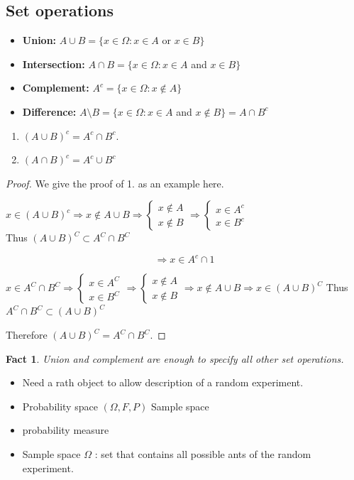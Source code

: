 \subsection{Set operations}
\begin{itemize}
  \item \textbf{Union:} \(A \cup B=\{x \in \Omega: x \in A\) or \(x \in B\}\)
  \item \textbf{Intersection:} \(A \cap B=\{x \in \Omega: x \in A\) and \(x \in B\}\)
  \item \textbf{Complement:} \(A^{c}=\{x \in \Omega: x \notin A\}\)
  \item \textbf{Difference:} \(A \setminus B=\{x \in \Omega: x \in A\) and \(x \notin B\}=A \cap B^{c}\)
\end{itemize}

\newtheorem{fact}{Fact}

\begin{theorem}
\begin{enumerate}
\item \((A \cup B)^{c}=A^{c} \cap B^{c}\).
\item \((A \cap B)^{c}=A^{c} \cup B^{c}\)
\end{enumerate}
\end{theorem}
\begin{proof}
We give the proof of 1. as an example here.

\(x \in(A \cup B)^{c} \Rightarrow x \notin A \cup B \Rightarrow\left\{\begin{array}{l}x \notin A \\ x \notin B\end{array} \Rightarrow\left\{\begin{array}{l}x \in A^{c} \\ x \in B^{c}\end{array}\right.\right.\)\\
Thus \((A \cup B)^{C} \subset A^{C} \cap B^{C}\)

\[
\Rightarrow x \in A^{c} \cap 1
\]

\(x \in A^{C} \cap B^{C} \Rightarrow\left\{\begin{array}{l}x \in A^{C} \\ x \in B^{C}\end{array} \Rightarrow\left\{\begin{array}{l}x \notin A \\ x \notin B\end{array} \Rightarrow x \notin A \cup B \Rightarrow x \in(A \cup B)^{C}\right.\right.\) Thus \(A^{C} \cap B^{C} \subset(A \cup B)^{C}\)

Therefore \((A \cup B)^{C}=A^{C} \cap B^{C}\).
\end{proof}
\begin{fact}
Union and complement are enough to specify all other set operations.
\end{fact}



\begin{itemize}
  \item[-] Need a rath object to allow description of a random experiment.
  \item[-] Probability space \((\Omega, F, P)\) Sample space
  \item[] probability measure
  \item[-] Sample space \(\Omega\) : set that contains all possible ants of the random experiment.
\end{itemize}
